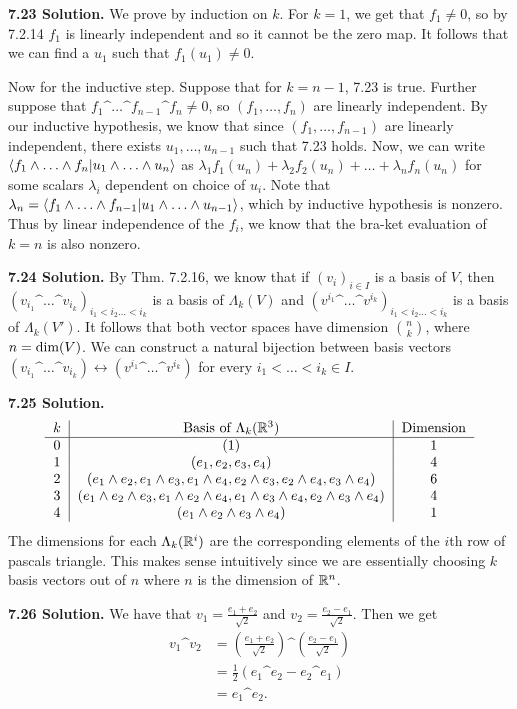 \textbf{7.23 Solution.} We prove by induction on $k$. For $k = 1$, we get that $f_1 \neq 0$, so by 7.2.14 $f_1$ is linearly independent and so it cannot be the zero map. It follows that we can find a $u_1$ such that $f_1(u_1) \neq 0$.

Now for the inductive step. Suppose that for $k = n - 1$, 7.23 is true. Further suppose that $f_1 \^ \dots \^ f_{n-1} \^ f_n \neq 0$, so $(f_1, \dots, f_n)$ are linearly independent. By our inductive hypothesis, we know that since $(f_1, \dots, f_{n-1})$ are linearly independent, there exists $u_1, \dots, u_{n-1}$ such that 7.23 holds. Now, we can write $\<f_1 \^ \dots \^ f_n | u_1 \^ \dots \^ u_n\>$ as $\lambda_1f_1(u_n) + \lambda_2f_2(u_n) + \dots + \lambda_nf_n(u_n)$ for some scalars $\lambda_i$ dependent on choice of $u_i$. Note that $\lambda_n = \<f_1 \^ \dots \^ f_{n-1} | u_1 \^ \dots \^ u_{n-1}\>$, which by inductive hypothesis is nonzero. Thus by linear independence of the $f_i$, we know that the bra-ket evaluation of $k = n$ is also nonzero.

\textbf{7.24 Solution.} By Thm. 7.2.16, we know that if $(v_i)_{i \in I}$ is a basis of $V$, then $(v_{i_1} \^ \dots \^ v_{i_k})_{i_1 < i_2 \dots < i_k}$ is a basis of $\Lambda_k(V)$ and $(v^{i_1} \^ \dots \^ v^{i_k})_{i_1 < i_2 \dots < i_k}$ is a basis of $\Lambda_k(V')$. It follows that both vector spaces have dimension $\binom{n}{k}$, where $n = \text{dim}(V)$. We can construct a natural bijection between basis vectors $(v_{i_1} \^ \dots \^ v_{i_k}) \longleftrightarrow (v^{i_1} \^ \dots \^ v^{i_k})$ for every $i_1 < \dots < i_k \in I$.

\textbf{7.25 Solution.} 
\[\begin{tabular}{c|c|c}
$k$ & Basis of $\Lambda_k(\R^3)$ & Dimension \\
\hline
0 & (1) & 1 \\
1 & $(e_1, e_2, e_3, e_4)$ & 4 \\
2 & $(e_1 \^ e_2, e_1 \^ e_3, e_1 \^ e_4, e_2 \^ e_3, e_2 \^ e_4, e_3 \^ e_4)$ & 6 \\
3 & $(e_1 \^ e_2 \^ e_3, e_1 \^ e_2 \^ e_4, e_1 \^ e_3 \^ e_4, e_2 \^ e_3 \^ e_4)$ & 4 \\
4 & $(e_1 \^ e_2 \^ e_3 \^ e_4)$ & 1
\end{tabular}\]
The dimensions for each $\Lambda_k(\mathbb{R}^i)$ are the corresponding elements of the $i$th row of pascals triangle. This makes sense intuitively since we are essentially choosing $k$ basis vectors out of $n$ where $n$ is the dimension of $\mathbb{R}^n$.

\textbf{7.26 Solution.} We have that $v_1 = \frac{e_1 + e_2}{\sqrt{2}}$ and $v_2 = \frac{e_2 - e_1}{\sqrt{2}}$. Then we get
\begin{align*}
    v_1 \^ v_2 &= \left(\frac{e_1 + e_2}{\sqrt{2}}\right) \^ \left(\frac{e_2 - e_1}{\sqrt{2}}\right) \\
    &= \frac{1}{2}(e_1 \^ e_2 - e_2 \^ e_1) \\
    &= e_1 \^ e_2.
\end{align*}

